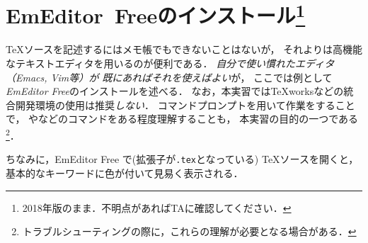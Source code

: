 \documentclass{ltjsarticle}
\begin{document}
\section{EmEditor~Freeのインストール\footnote{%
  2018年版のまま．不明点があればTAに確認してください．
}}
\TeX ソースを記述するにはメモ帳でもできないことはないが，
それよりは高機能なテキストエディタを用いるのが便利である．
\emph{自分で使い慣れたエディタ（Emacs, Vim等）が
  既にあればそれを使えばよい}が，
ここでは例として\emph{EmEditor Free}のインストールを述べる．
なお，本実習では\TeX worksなどの統合開発環境の使用は推奨\emph{しない}．
コマンドプロンプトを用いて作業をすることで，
やなどのコマンドをある程度理解することも，
本実習の目的の一つである\footnote{トラブルシューティングの際に，これらの理解が必要となる場合がある．}．

ちなみに，EmEditor Free で(拡張子が\texttt{.tex}となっている) \TeX ソースを開くと，
基本的なキーワードに色が付いて見易く表示される．
\end{document}
